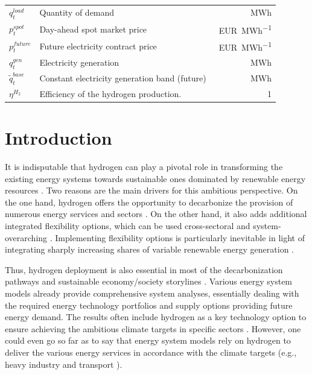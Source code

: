 \documentclass[review]{elsarticle}
\begin{document}
\begin{center}
\begin{tabular}{lm{8cm}r}
		{$q_{t}^{load}$} & Quantity of demand & \SI{}{MWh}\\
		{$p_{t}^{spot}$} & Day-ahead spot market price & \SI{}{EUR\per MWh}\\
		{$p_{t}^{future}$} & Future electricity contract price & \SI{}{EUR\per MWh}\\
		{$q_{t}^{gen}$} & Electricity generation & \SI{}{MWh}\\
		{$\tilde{q}_{t}^{base}$} & Constant electricity generation band (future)& \SI{}{MWh}\\
		{$\eta^{H_2}$} & Efficiency of the hydrogen	production.& \SI{}{1}\\	
		\hline
	\end{tabular}
\end{center}

\section{Introduction}
It is indisputable that hydrogen can play a pivotal role in transforming the existing energy systems towards sustainable ones dominated by renewable energy resources \cite{dunn2002hydrogen}. Two reasons are the main drivers for this ambitious perspective. On the one hand, hydrogen offers the opportunity to decarbonize the provision of numerous energy services and sectors \cite{midilli2008hydrogen}. On the other hand, it also adds additional integrated flexibility options, which can be used cross-sectoral and system-overarching \cite{kueppers2021decarbonization}. Implementing flexibility options is particularly inevitable in light of integrating sharply increasing shares of variable renewable energy generation \cite{kroniger2014hydrogen}.\vspace{0.3cm}

Thus, hydrogen deployment is also essential in most of the decarbonization pathways and sustainable economy/society storylines \cite{herbst2021scenario}. Various energy system models already provide comprehensive system analyses, essentially dealing with the required energy technology portfolios and supply options providing future energy demand. The results often include hydrogen as a key technology option to ensure achieving the ambitious climate targets in specific sectors \cite{lux2020supply}. However, one could even go so far as to say that energy system models rely on hydrogen to deliver the various energy services in accordance with the climate targets (e.g., heavy industry \cite{rissman2020technologies} and transport \cite{zhang2016times}).\vspace{0.3cm}
\end{document}
